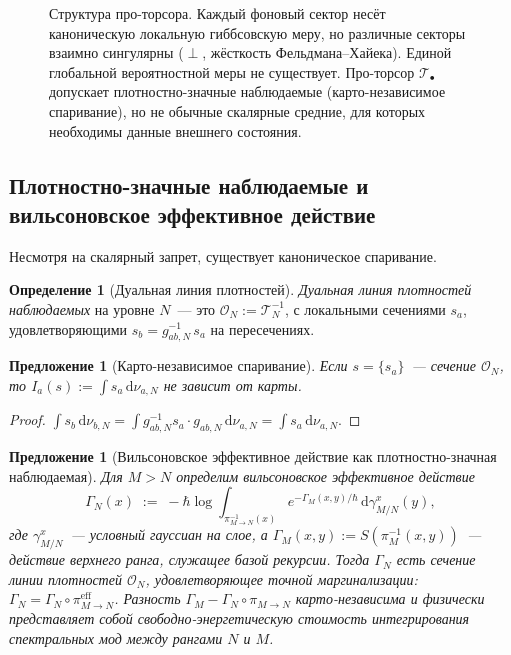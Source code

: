 \documentclass[12pt,a4paper]{article}
\theoremstyle{plain}
\newtheorem{proposition}[theorem]{Предложение}
\theoremstyle{definition}
\newtheorem{definition}[theorem]{Определение}
\theoremstyle{remark}
\newcommand{\dd}{\mathrm{d}}
\newcommand{\cO}{\mathcal{O}}
\begin{document}
\begin{figure}[ht]
\caption{Структура про-торсора.  Каждый фоновый сектор несёт
каноническую локальную гиббсовскую меру, но различные секторы
взаимно сингулярны ($\perp$, жёсткость Фельдмана--Хайека).
Единой глобальной вероятностной меры не существует.
Про-торсор $\mathcal{T}_\bullet$ допускает плотностно-значные
наблюдаемые (карто-независимое спаривание), но не обычные
скалярные средние, для которых необходимы данные внешнего
состояния.}
\label{fig:protorsor}
\end{figure}

\subsection{Плотностно-значные наблюдаемые и вильсоновское
  эффективное действие}

Несмотря на скалярный запрет, существует каноническое спаривание.

\begin{definition}[Дуальная линия плотностей]
\label{def:density-line}
\emph{Дуальная линия плотностей наблюдаемых} на уровне $N$~---
это $\cO_N := \mathcal{T}_N^{-1}$, с локальными сечениями $s_a$,
удовлетворяющими $s_b = g_{ab,N}^{-1}\,s_a$ на пересечениях.
\end{definition}

\begin{proposition}[Карто-независимое спаривание]
\label{prop:canonical-pairing}
Если $s = \{s_a\}$~--- сечение $\cO_N$, то
$I_a(s) := \int s_a\,\dd\nu_{a,N}$ не зависит от карты.
\end{proposition}

\begin{proof}
$\int s_b\,\dd\nu_{b,N} = \int g_{ab,N}^{-1}s_a\cdot g_{ab,N}\,
\dd\nu_{a,N} = \int s_a\,\dd\nu_{a,N}$.
\end{proof}

\begin{proposition}[Вильсоновское эффективное действие
как плотностно-значная наблюдаемая]
\label{prop:wilsonian}
Для $M > N$ определим вильсоновское эффективное действие
\begin{equation}\label{eq:wilsonian}
  \Gamma_N(x) \;:=\; -\hbar\log
  \int_{\pi_{M\to N}^{-1}(x)} e^{-\Gamma_M(x,y)/\hbar}\,
  \dd\gamma_{M/N}^x(y),
\end{equation}
где $\gamma_{M/N}^x$~--- условный гауссиан на слое, а
$\Gamma_M(x,y) := S(\pi_M^{-1}(x,y))$~--- действие
верхнего ранга, служащее базой рекурсии.
Тогда $\Gamma_N$ есть сечение линии плотностей $\cO_N$,
удовлетворяющее точной маргинализации:
$\Gamma_N = \Gamma_N \circ \pi_{M\to N}^{\mathrm{eff}}$.
Разность $\Gamma_M - \Gamma_N \circ \pi_{M\to N}$
карто-независима и физически представляет собой свободно-энергетическую
стоимость интегрирования спектральных мод между рангами $N$ и $M$.
\end{proposition}
\end{document}
